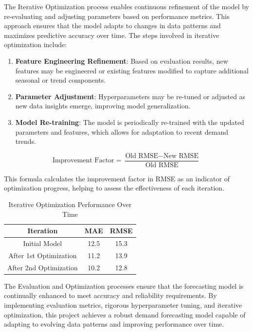 The Iterative Optimization process enables continuous refinement of the model by re-evaluating and adjusting parameters based on performance metrics. This approach ensures that the model adapts to changes in data patterns and maximizes predictive accuracy over time. The steps involved in iterative optimization include:

\begin{enumerate}
    \item \textbf{Feature Engineering Refinement}: Based on evaluation results, new features may be engineered or existing features modified to capture additional seasonal or trend components.
    \item \textbf{Parameter Adjustment}: Hyperparameters may be re-tuned or adjusted as new data insights emerge, improving model generalization.
    \item \textbf{Model Re-training}: The model is periodically re-trained with the updated parameters and features, which allows for adaptation to recent demand trends.
\end{enumerate}

\begin{equation}
    \text{Improvement Factor} = \frac{\text{Old RMSE} - \text{New RMSE}}{\text{Old RMSE}}
\end{equation}

This formula calculates the improvement factor in RMSE as an indicator of optimization progress, helping to assess the effectiveness of each iteration.

\begin{table}[H]
\centering
\caption{Iterative Optimization Performance Over Time}
\begin{tabular}{|c|c|c|}
\hline
\textbf{Iteration} & \textbf{MAE} & \textbf{RMSE} \\ \hline
Initial Model & 12.5 & 15.3 \\ \hline
After 1st Optimization & 11.2 & 13.9 \\ \hline
After 2nd Optimization & 10.2 & 12.8 \\ \hline
\end{tabular}
\end{table}

The Evaluation and Optimization processes ensure that the forecasting model is continually enhanced to meet accuracy and reliability requirements. By implementing evaluation metrics, rigorous hyperparameter tuning, and iterative optimization, this project achieves a robust demand forecasting model capable of adapting to evolving data patterns and improving performance over time.

